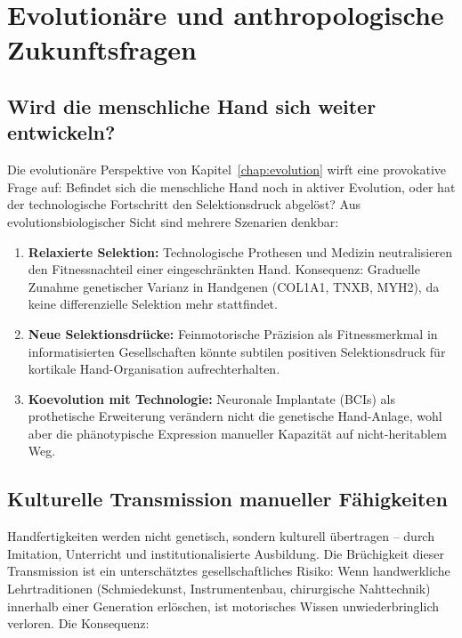 ﻿\documentclass[12pt,a4paper]{report}
\theoremstyle{plain}
\theoremstyle{definition}
\theoremstyle{remark}
\begin{document}
\section{Evolutionäre und anthropologische Zukunftsfragen}

\subsection{Wird die menschliche Hand sich weiter entwickeln?}

Die evolutionäre Perspektive von Kapitel~\ref{chap:evolution} wirft
eine provokative Frage auf: Befindet sich die menschliche Hand noch in
aktiver Evolution, oder hat der technologische Fortschritt den
Selektionsdruck abgelöst? Aus evolutionsbiologischer Sicht sind
mehrere Szenarien denkbar:

\begin{enumerate}
\item \textbf{Relaxierte Selektion:} Technologische Prothesen und
  Medizin neutralisieren den Fitnessnachteil einer eingeschränkten Hand.
  Konsequenz: Graduelle Zunahme genetischer Varianz in Handgenen
  (COL1A1, TNXB, MYH2), da keine differenzielle Selektion mehr stattfindet.
\item \textbf{Neue Selektionsdrücke:} Feinmotorische Präzision als
  Fitnessmerkmal in informatisierten Gesellschaften könnte subtilen
  positiven Selektionsdruck für kortikale Hand-Organisation aufrechterhalten.
\item \textbf{Koevolution mit Technologie:} Neuronale Implantate (BCIs)
  als prothetische Erweiterung verändern nicht die genetische Hand-Anlage,
  wohl aber die phänotypische Expression manueller Kapazität auf
  nicht-heritablem Weg.
\end{enumerate}

\subsection{Kulturelle Transmission manueller Fähigkeiten}

Handfertigkeiten werden nicht genetisch, sondern kulturell übertragen --
durch Imitation, Unterricht und institutionalisierte Ausbildung. Die
Brüchigkeit dieser Transmission ist ein unterschätztes gesellschaftliches
Risiko: Wenn handwerkliche Lehrtraditionen (Schmiedekunst, Instrumentenbau,
chirurgische Nahttechnik) innerhalb einer Generation erlöschen, ist
motorisches Wissen unwiederbringlich verloren. Die Konsequenz:
\end{document}
